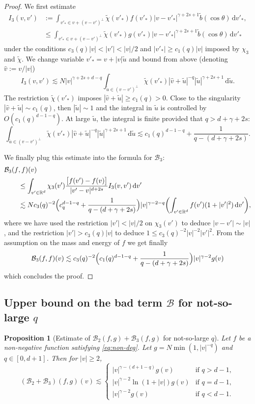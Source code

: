 \documentclass[11pt]{article}
\newcommand{\Subsection}{\subsection}
\theoremstyle{plain}
\newtheorem{prop}[thm]{Proposition}
\theoremstyle{definition}
\numberwithin{equation}{section}
\newcommand{\R}{\mathbb R}
\newcommand{\dd} {\, \mathrm{d}}
\let\A N
\begin{document}
\begin{proof}
We first estimate
\[
\begin{aligned}
I_3(v,v') &:= \int_{v'_* \in v + (v-v')^\bot} \tilde \chi(v'_*)
f(v'_*) |v-v'_*|^{\gamma+2s +1} \tilde b(\cos \theta) \dd v'_*, \\
&\leq \int_{v'_* \in v + (v-v')^\bot} \tilde \chi(v'_*)
g(v'_*) |v-v'_*|^{\gamma+2s +1} \tilde b(\cos \theta) \dd v'_*
\end{aligned}
\]
under the conditions $c_3(q) |v| < |v'| < |v|/2$ and
$|v'_*| \ge c_1(q) |v|$ imposed by $\chi_3$ and $\tilde \chi$. We
change variable $v'_* = v + |v|\tilde u$ and bound from above
(denoting $\hat v:=v/|v|$)
\[
I_3(v,v') \lesssim \A |v|^{\gamma+2s+d -q} \int_{\tilde u \in
(v-v')^\bot} \tilde \chi(v'_*) \left| \hat v + \tilde u
\right|^{-q} \left| \tilde u \right|^{\gamma+2s +1} \dd \tilde u.
\]
The restriction $\tilde \chi(v'_*)$ imposes
$|\hat v + \tilde u| \ge c_1(q) >0$. Close to the singularity
$|\hat v + \tilde u| \sim c_1(q)$, then $|\tilde u| \sim 1$ and the
integral in $\tilde u$ is controlled by $O(c_1(q)^{d-1-q})$. At large
$\tilde u$, the integral is finite provided that $q >
d+\gamma+2s$:
\[
\int_{\tilde u \in
(v-v')^\bot} \tilde \chi(v'_*) \left| \hat v + \tilde u
\right|^{-q} \left| \tilde u \right|^{\gamma+2s +1} \dd \tilde u
\lesssim c_1(q)^{d-1-q} + \frac{1}{q-(d+\gamma+2s)}.
\]

We finally plug this estimate into the formula for $\mathcal{B}_3$:
\begin{align*}
\mathcal{B}_3(f&,f)(v) \\ &\le \int_{v'\in \R^d} \chi_3(v') \frac{\big[
f(v')-f(v) \big]}{|v'-v|^{d+2s}} I_3(v,v') \dd v'\\
&\lesssim \A c_3(q)^{-2} \Bigl( c_q^{d-1-q} + \frac{1}{q-(d+\gamma+2s)}
\Bigr) |v|^{\gamma-2-q} \biggl( \int_{v'\in \R^d} f(v')(1+|v'|^2) \dd
v'\biggr),
\end{align*}
where we have used the restriction $|v'|<|v|/2$ on $\chi_3(v')$ to
deduce $|v-v'| \sim |v|$, and the restriction $|v'| >c_3(q)|v|$ to
deduce $1 \le c_3(q)^{-2} |v|^{-2}|v'|^2$. From the assumption on the
mass and energy of $f$ we get finally
\[
\mathcal{B}_3(f,f)(v) \lesssim c_3(q)^{-2} \Bigl( c_1(q)^{d-1-q} +
\frac{1}{q-(d+\gamma+2s)} \Bigr) |v|^{\gamma-2} g(v)
\]
which concludes the proof.
\end{proof}

\Subsection{Upper bound on the bad term $\mathcal{B}$ for not-so-large
$q$}

\begin{prop}[Estimate of {$\mathcal{B}_2(f,g) + \mathcal{B}_3(f,g)$} for not-so-large $q$]\label{prop:B23}
Let $f$ be a non-negative function satisfying \eqref{eq:non-deg}. Let $g = \A \min(1,|v|^{-q})$ and $q \in [0,d+1]$. Then for $|v| \ge 2$,
\[
(\mathcal{B}_2 + \mathcal{B}_3)(f,g)(v) \lesssim
\begin{cases}
|v|^{\gamma-(d+1-q)}g(v) & \text{if } q > d-1,\\
|v|^{\gamma-2} \ln (1+|v|)g(v) & \text{if } q = d-1,\\
|v|^{\gamma-2}g(v) & \text{if } q < d-1.
\end{cases}
\]
\end{prop}
\end{document}
